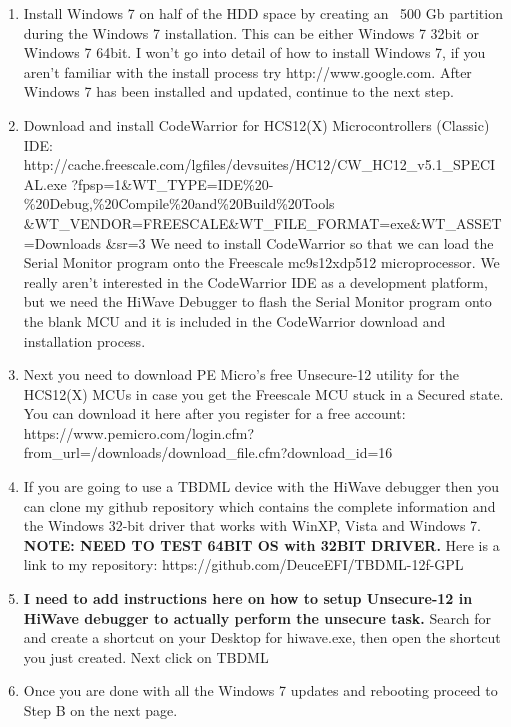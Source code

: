 \documentclass[12pt,notitlepage,onecolumn,oneside,openany,draft]{memoir}
\begin{document}
\begin{enumerate}
\item Install Windows 7 on half of the HDD space by creating an ~500 Gb partition during the Windows 7 installation.
\textsf{This can be either Windows 7 32bit or Windows 7 64bit.  I won't go into detail of how to install Windows 7, if you aren't familiar with the install process try http://www.google.com.  After Windows 7 has been installed and updated, continue to the next step.}

\item Download and install CodeWarrior for HCS12(X) Microcontrollers (Classic) IDE: \newline
\textsf{http://cache.freescale.com/lgfiles/devsuites/HC12/CW\_HC12\_v5.1\_SPECIAL.exe \newline 
?fpsp=1\&WT\_TYPE=IDE\%20-\%20Debug,\%20Compile\%20and\%20Build\%20Tools \newline 
\&WT\_VENDOR=FREESCALE\&WT\_FILE\_FORMAT=exe\&WT\_ASSET=Downloads \newline
\&sr=3} \newline
\newline
\textsf{We need to install CodeWarrior so that we can load the Serial Monitor program onto the Freescale mc9s12xdp512 microprocessor.  We really aren't interested in the CodeWarrior IDE as a development platform, but we need the HiWave Debugger to flash the Serial Monitor program onto the blank MCU and it is included in the CodeWarrior download and installation process.}

\item Next you need to download PE Micro's free Unsecure-12 utility for the HCS12(X) MCUs in case you get the Freescale MCU stuck in a Secured state. You can download it here after you register for a free account: \newline
\textsf{https://www.pemicro.com/login.cfm?from\_url=/downloads/download\_file.cfm?download\_id=16}

\item If you are going to use a TBDML device with the HiWave debugger then you can clone my github repository which contains the complete information and the Windows 32-bit driver that works with WinXP, Vista and Windows 7. \textbf{NOTE: NEED TO TEST 64BIT OS with 32BIT DRIVER.}
\newline Here is a link to my repository: \newline
\textsf{https://github.com/DeuceEFI/TBDML-12f-GPL}

\item \textbf{I need to add instructions here on how to setup Unsecure-12 in HiWave debugger to actually perform the unsecure task.}
Search for and create a shortcut on your Desktop for hiwave.exe, then open the shortcut you just created.  
Next click on TBDML

\item Once you are done with all the Windows 7 updates and rebooting proceed to Step B on the next page.
\end{enumerate}
\end{document}
